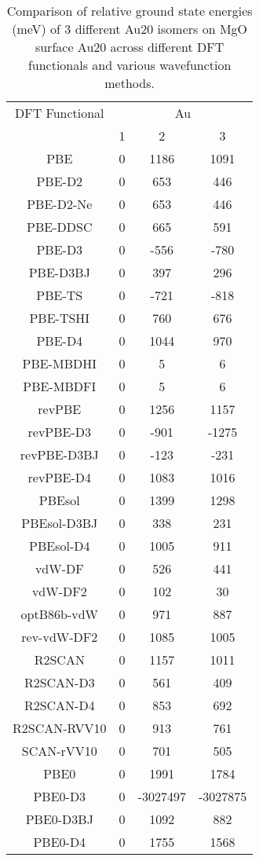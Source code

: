 \begin{table}[ht]
\centering
\caption{Comparison of relative ground state energies (meV) of 3 different Au20 isomers on MgO surface Au20 across different DFT functionals and various wavefunction methods.}
\begin{tabular}{cccc}
\hline\hline
DFT Functional & \multicolumn{3}{c}{Au} \\ 
\cline{2-4}
 & 1 & 2 & 3 \\ \hline
PBE & 0 & 1186 & 1091 \\ 
PBE-D2 & 0 & 653 & 446 \\ 
PBE-D2-Ne & 0 & 653 & 446 \\ 
PBE-DDSC & 0 & 665 & 591 \\ 
PBE-D3 & 0 & -556 & -780 \\ 
PBE-D3BJ & 0 & 397 & 296 \\ 
PBE-TS & 0 & -721 & -818 \\ 
PBE-TSHI & 0 & 760 & 676 \\ 
PBE-D4 & 0 & 1044 & 970 \\ 
PBE-MBDHI & 0 & 5 & 6 \\ 
PBE-MBDFI & 0 & 5 & 6 \\ 
revPBE & 0 & 1256 & 1157 \\ 
revPBE-D3 & 0 & -901 & -1275 \\ 
revPBE-D3BJ & 0 & -123 & -231 \\ 
revPBE-D4 & 0 & 1083 & 1016 \\ 
PBEsol & 0 & 1399 & 1298 \\ 
PBEsol-D3BJ & 0 & 338 & 231 \\ 
PBEsol-D4 & 0 & 1005 & 911 \\ 
vdW-DF & 0 & 526 & 441 \\ 
vdW-DF2 & 0 & 102 & 30 \\ 
optB86b-vdW & 0 & 971 & 887 \\ 
rev-vdW-DF2 & 0 & 1085 & 1005 \\ 
R2SCAN & 0 & 1157 & 1011 \\ 
R2SCAN-D3 & 0 & 561 & 409 \\ 
R2SCAN-D4 & 0 & 853 & 692 \\ 
R2SCAN-RVV10 & 0 & 913 & 761 \\ 
SCAN-rVV10 & 0 & 701 & 505 \\ 
PBE0 & 0 & 1991 & 1784 \\ 
PBE0-D3 & 0 & -3027497 & -3027875 \\ 
PBE0-D3BJ & 0 & 1092 & 882 \\ 
PBE0-D4 & 0 & 1755 & 1568 \\ 

\end{tabular}
\end{table}
